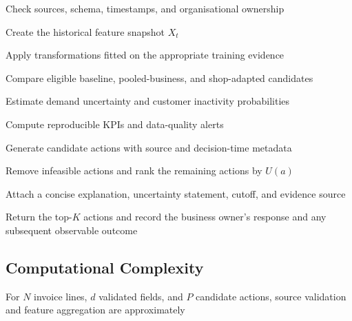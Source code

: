 \documentclass[a4paper,11pt,oneside]{book}
\theoremstyle{plain}
\theoremstyle{definition}
\theoremstyle{remark}
\newcommand{\system}{B-SMART}
\begin{document}
\begin{algorithm}[H]
\caption{\system{} Strategy Recommendation}
\label{alg:bsmart}



Check sources, schema, timestamps, and organisational ownership\;

Create the historical feature snapshot \(X_t\)\;

Apply transformations fitted on the appropriate training evidence\;

Compare eligible baseline, pooled-business, and shop-adapted candidates\;

Estimate demand uncertainty and customer inactivity probabilities\;

Compute reproducible KPIs and data-quality alerts\;

Generate candidate actions with source and decision-time metadata\;


Remove infeasible actions and rank the remaining actions by \(U(a)\)\;

Attach a concise explanation, uncertainty statement, cutoff, and evidence
source\;

Return the top-\(K\) actions and record the business owner's response and any subsequent
observable outcome\;

\end{algorithm}


\subsection{Computational Complexity}

For \(N\) invoice lines, \(d\) validated fields, and \(P\) candidate actions,
source validation and feature aggregation are approximately
\end{document}
